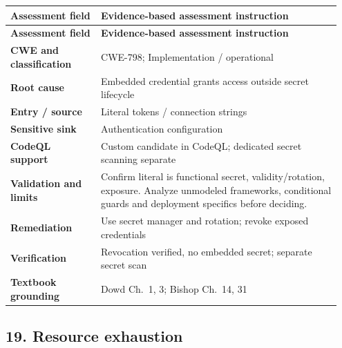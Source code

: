 \documentclass[11pt,letterpaper,oneside]{book}
\begin{document}
\small
\setlength{\tabcolsep}{2pt}
\renewcommand{\arraystretch}{1.18}
\begin{longtable}{>{\raggedright\arraybackslash}p{0.26\linewidth}>{\raggedright\arraybackslash}p{0.69\linewidth}}
\toprule
\textbf{Assessment field} & \textbf{Evidence-based assessment instruction}\\
\midrule
\endfirsthead
\toprule
\textbf{Assessment field} & \textbf{Evidence-based assessment instruction}\\
\midrule
\endhead
\textbf{CWE and classification} & CWE-798; Implementation / operational\\
\textbf{Root cause} & Embedded credential grants access outside secret lifecycle\\
\textbf{Entry / source} & Literal tokens / connection strings\\
\textbf{Sensitive sink} & Authentication configuration\\
\textbf{CodeQL support} & Custom candidate in CodeQL; dedicated secret scanning separate\\
\textbf{Validation and limits} & Confirm literal is functional secret, validity/rotation, exposure. Analyze unmodeled frameworks, conditional guards and deployment specifics before deciding.\\
\textbf{Remediation} & Use secret manager and rotation; revoke exposed credentials\\
\textbf{Verification} & Revocation verified, no embedded secret; separate secret scan\\
\textbf{Textbook grounding} & Dowd Ch.~1, 3; Bishop Ch.~14, 31\\
\bottomrule
\end{longtable}
\normalsize

\subsection{19. Resource exhaustion}
\end{document}
